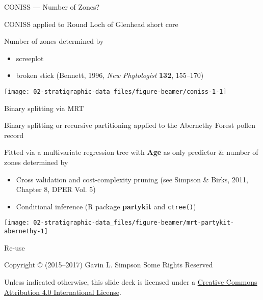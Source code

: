 \documentclass[10pt,ignorenonframetext,compress, aspectratio=169]{beamer}
\providecommand{\tightlist}{%
  \setlength{\itemsep}{0pt}\setlength{\parskip}{0pt}}
\begin{document}
\begin{frame}{CONISS --- Number of Zones?}

CONISS applied to Round Loch of Glenhead short core

Number of zones determined by

\begin{itemize}
\tightlist
\item
  screeplot
\item
  broken stick (Bennett, 1996, \emph{New Phytologist} \textbf{132},
  155--170)
\end{itemize}

\begin{center}\texttt{[image: 02-stratigraphic-data\_files/figure-beamer/coniss-1-1]} \end{center}

\end{frame}

\begin{frame}[fragile]{Binary splitting via MRT}

\alert{Binary splitting} or \alert{recursive partitioning} applied to
the Abernethy Forest pollen record

Fitted via a \alert{multivariate regression tree} with \textbf{Age} as
only predictor \& number of zones determined by

\begin{itemize}
\tightlist
\item
  Cross validation and cost-complexity pruning (see Simpson \& Birks,
  2011, Chapter 8, DPER Vol. 5)
\item
  Conditional inference (R package \textbf{partykit} and
  \texttt{ctree()})
\end{itemize}

\begin{center}\texttt{[image: 02-stratigraphic-data\_files/figure-beamer/mrt-partykit-abernethy-1]} \end{center}

\end{frame}

\begin{frame}{Re-use}

Copyright © (2015--2017) Gavin L. Simpson Some Rights Reserved

Unless indicated otherwise, this slide deck is licensed under a
\href{http://creativecommons.org/licenses/by/4.0/}{Creative Commons
Attribution 4.0 International License}.

\begin{center}
  \ccby
\end{center}

\end{frame}
\end{document}
